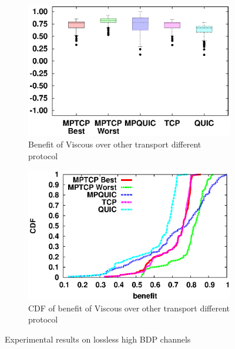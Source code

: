 \begin{figure}
	\captionsetup[subfigure]{}
	\begin{center}
		\begin{subfigure}{.49\linewidth}
			\includegraphics[width=.95\linewidth]{img/highbdp-lossless/highbdpnoloss_benefit.eps}
		 \caption{\label{fig:benefit-box-high} Benefit of Viscous over other transport different protocol}
		\end{subfigure}
		\begin{subfigure}{.49\linewidth}
			\includegraphics[width=.95\linewidth]{img/highbdp-lossless/highbdpnoloss_cdf.eps}
		 \caption{\label{fig:benefit-cdf-high} CDF of benefit of Viscous over other transport different protocol}
		\end{subfigure}
		\caption{\label{fig:benefit-high}Experimental results on lossless high BDP channels}
	\end{center}
\end{figure}


